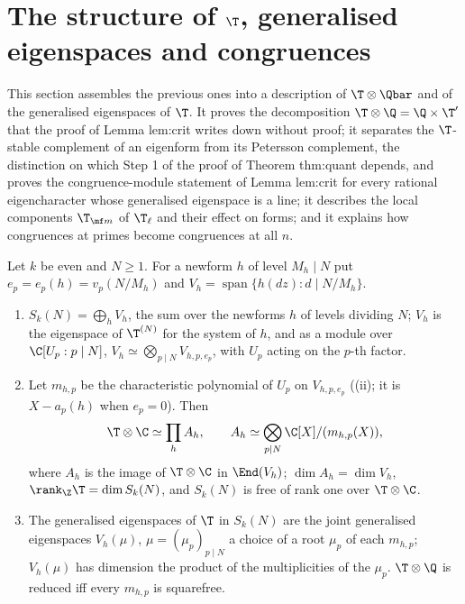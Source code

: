\section{The structure of $\T$, generalised eigenspaces and congruences}\label{sec:hecke:structure}

This section assembles the previous ones into a description of $\T\otimes\Qbar$ and of the generalised eigenspaces of $\T$. It proves the decomposition $\T\otimes\Q=\Q\times\T'$ that
the proof of Lemma lem:crit writes down without proof; it separates the $\T$-stable complement of an eigenform from its Petersson complement, the distinction on which
Step 1 of the proof of Theorem thm:quant depends, and proves the congruence-module statement of Lemma lem:crit for every rational eigencharacter whose generalised eigenspace
is a line; it describes the local components $\T_{\mf m}$ of $\T_\ell$ and their effect on forms; and it explains how congruences at
primes become congruences at all $n$.

\begin{theorem}\label{thm:hecke:structure}
Let $k$ be even and $N\ge1$. For a newform $h$ of level $M_h\mid N$ put $e_p=e_p(h)=v_p(N/M_h)$ and $V_h=\operatorname{span}\{h(dz):d\mid N/M_h\}$.
\begin{enumerate}[label=(\roman*)]
\item $S_k(N)=\bigoplus_hV_h$, the sum over the newforms $h$ of levels dividing $N$; $V_h$ is the eigenspace of $\T^{(N)}$ for the system of $h$, and as a module over $\C[U_p:p\mid N]$,
$V_h\simeq\bigotimes_{p\mid N}V_{h,p,e_p}$, with $U_p$ acting on the $p$-th factor.
\item Let $m_{h,p}$ be the characteristic polynomial of $U_p$ on $V_{h,p,e_p}$ ((ii); it is $X-a_p(h)$ when $e_p=0$). Then
\[
\T\otimes\C\simeq\prod_hA_h,\qquad A_h\simeq\bigotimes_{p\mid N}\C[X]/(m_{h,p}(X)),
\]
where $A_h$ is the image of $\T\otimes\C$ in $\End(V_h)$; $\dim A_h=\dim V_h$, $\rank_\Z\T=\dim S_k(N)$, and $S_k(N)$ is free of rank one over $\T\otimes\C$.
\item The generalised eigenspaces of $\T$ in $S_k(N)$ are the joint generalised eigenspaces $V_h(\mu)$, $\mu=(\mu_p)_{p\mid N}$ a choice of a root $\mu_p$ of each $m_{h,p}$; $V_h(\mu)$ has dimension the
product of the multiplicities of the $\mu_p$. $\T\otimes\Q$ is reduced iff every $m_{h,p}$ is squarefree.
\end{enumerate}
\end{theorem}

